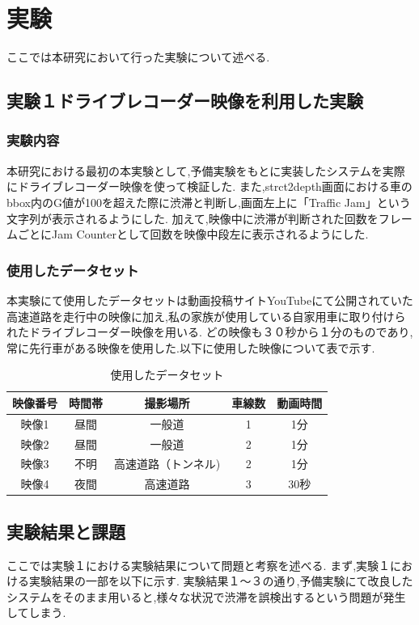 \chapter{実験}
ここでは本研究において行った実験について述べる.

\section{実験１ドライブレコーダー映像を利用した実験}
\subsection{実験内容}
本研究における最初の本実験として,予備実験をもとに実装したシステムを実際にドライブレコーダー映像を使って検証した.
また,strct2depth画面における車のbbox内のG値が100を超えた際に渋滞と判断し,画面左上に「Traffic Jam」という文字列が表示されるようにした.
加えて,映像中に渋滞が判断された回数をフレームごとにJam Counterとして回数を映像中段左に表示されるようにした.

\subsection{使用したデータセット}
本実験にて使用したデータセットは動画投稿サイトYouTubeにて公開されていた高速道路を走行中の映像に加え,私の家族が使用している自家用車に取り付けられたドライブレコーダー映像を用いる.
どの映像も３０秒から１分のものであり,常に先行車がある映像を使用した.以下に使用した映像について表で示す.

\begin{table}[htbp]
  \centering
  \begin{scriptsize}
  \begin{tabular}{ccccc}
  \toprule
映像番号 & 時間帯 & 撮影場所 & 車線数 & 動画時間\\
  \midrule
映像1 & 昼間 & 一般道 & 1 & 1分\\
映像2 & 昼間 & 一般道 & 2 & 1分\\
映像3 & 不明 & 高速道路（トンネル) & 2 & 1分 \\
映像4 & 夜間 & 高速道路 & 3 & 30秒\\
  \bottomrule
  \end{tabular}
  \end{scriptsize}
  \caption{使用したデータセット}
  \label{tab:dataset}
\end{table}
\newpage
\section{実験結果と課題}
ここでは実験１における実験結果について問題と考察を述べる.
まず,実験１における実験結果の一部を以下に示す.
実験結果１〜３の通り,予備実験にて改良したシステムをそのまま用いると,様々な状況で渋滞を誤検出するという問題が発生してしまう.


